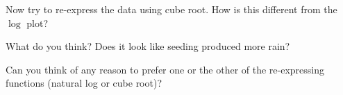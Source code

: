 \documentclass[12pt,letterpaper]{hmcpset}
\begin{document}
\begin{problem}[$\text{e}_2$]

     Now try to re-express the data using cube root. How is this different from the $\log$ plot?

\end{problem}

\begin{solution}

\end{solution}
\newpage

\begin{problem}[f]

    What do you think? Does it look like seeding produced more rain?

\end{problem}

\begin{solution}

\end{solution}
\newpage

\begin{problem}[g]

     Can you think of any reason to prefer one or the other of the re-expressing functions (natural log or cube root)?

\end{problem}

\begin{solution}

\end{solution}
\end{document}
